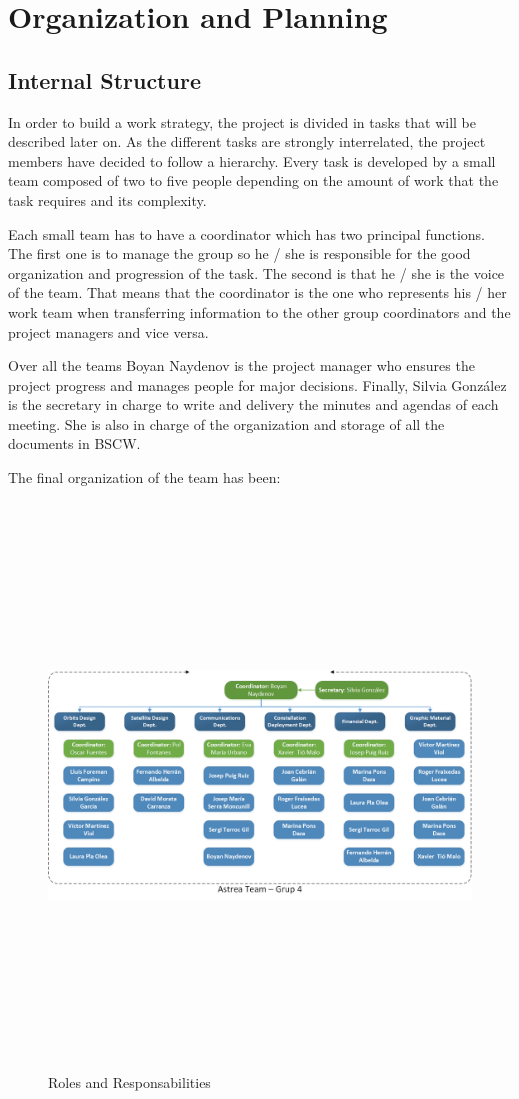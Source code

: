 \chapter{Organization and Planning}

\section{Internal Structure}
In order to build a work strategy, the project is divided in tasks that will be described later on. As the different tasks are strongly interrelated, the project members have decided to follow a hierarchy. Every task is developed by a small team composed of two to five people depending on the amount of work that the task requires and its complexity.

Each small team has to have a coordinator which has two principal functions. The first one is to manage the group so he / she is responsible for the good organization and progression of the task. The second is that he / she is the voice of the team. That means that the coordinator is the one who represents his / her work team when transferring information to the other group coordinators and the project managers and vice versa.

Over all the teams Boyan Naydenov is the project manager who ensures the project progress and manages people for major decisions. Finally, Silvia Gonz\'{a}lez is the secretary in charge to write and delivery the minutes and agendas of each meeting. She is also in charge of the organization and storage of all the documents in BSCW.

The final organization of the team has been:
 
\begin{figure}[H]
\centering
\includegraphics[width=15cm,height=15cm,keepaspectratio]{organigram-team.png}
\caption{Roles and Responsabilities}
\end{figure}

